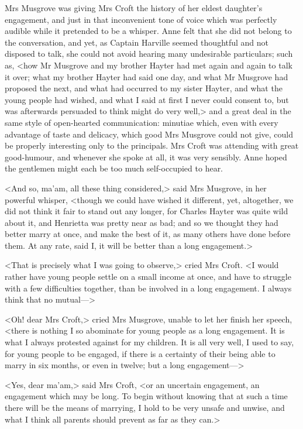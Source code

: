 Mrs Musgrove was giving Mrs Croft the history of her eldest daughter's engagement, and just in that inconvenient tone of voice which was perfectly audible while it pretended to be a whisper. Anne felt that she did not belong to the conversation, and yet, as Captain Harville seemed thoughtful and not disposed to talk, she could not avoid hearing many undesirable particulars; such as, <how Mr Musgrove and my brother Hayter had met again and again to talk it over; what my brother Hayter had said one day, and what Mr Musgrove had proposed the next, and what had occurred to my sister Hayter, and what the young people had wished, and what I said at first I never could consent to, but was afterwards persuaded to think might do very well,> and a great deal in the same style of open-hearted communication: minutiae which, even with every advantage of taste and delicacy, which good Mrs Musgrove could not give, could be properly interesting only to the principals. Mrs Croft was attending with great good-humour, and whenever she spoke at all, it was very sensibly. Anne hoped the gentlemen might each be too much self-occupied to hear.

<And so, ma'am, all these thing considered,> said Mrs Musgrove, in her powerful whisper, <though we could have wished it different, yet, altogether, we did not think it fair to stand out any longer, for Charles Hayter was quite wild about it, and Henrietta was pretty near as bad; and so we thought they had better marry at once, and make the best of it, as many others have done before them. At any rate, said I, it will be better than a long engagement.>

<That is precisely what I was going to observe,> cried Mrs Croft. <I would rather have young people settle on a small income at once, and have to struggle with a few difficulties together, than be involved in a long engagement. I always think that no mutual—>

<Oh! dear Mrs Croft,> cried Mrs Musgrove, unable to let her finish her speech, <there is nothing I so abominate for young people as a long engagement. It is what I always protested against for my children. It is all very well, I used to say, for young people to be engaged, if there is a certainty of their being able to marry in six months, or even in twelve; but a long engagement—>

<Yes, dear ma'am,> said Mrs Croft, <or an uncertain engagement, an engagement which may be long. To begin without knowing that at such a time there will be the means of marrying, I hold to be very unsafe and unwise, and what I think all parents should prevent as far as they can.>

